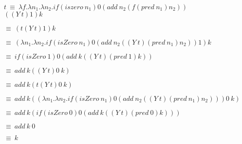$t~\equiv~\lambda f.\lambda n_1.\lambda n_2.if(iszero~n_1)0(add~
n_2(f(pred~n_1)n_2))$ \\

$((Y~t)1)k$

$\equiv~(t(Y~t)1)k$

$\equiv~(\lambda n_1.\lambda n_2.if(isZero~n_1)0(add~n_2((Y~t)(pred~n_1)n_2))1)k$

$\equiv~if(isZero~1)0(add~k((Y~t)(pred~1)k))$

$\equiv~add~k((Y~t)0~k)$

$\equiv~add~k(t(Y~t)0~k)$

$\equiv~add~k((\lambda n_1.\lambda n_2.if(isZero
~n_1)0(add~n_2((Y~t)(pred~n_1)n_2)))0~k)$

$\equiv~add~k(if(isZero~0)0(add~k((Y~t)(pred~0)k)))$

$\equiv~add~k~0$

$\equiv~k$